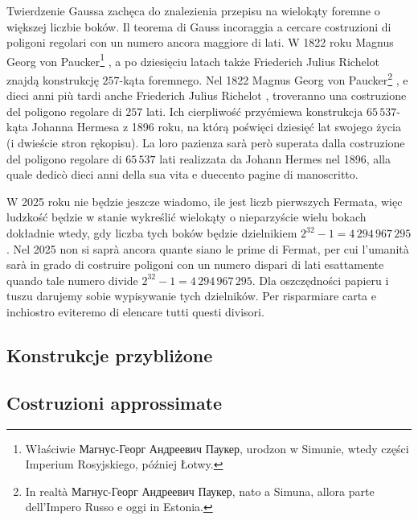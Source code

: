 Twierdzenie Gaussa zachęca do znalezienia przepisu na wielokąty foremne o większej liczbie boków. %
Il teorema di Gauss incoraggia a cercare costruzioni di poligoni regolari con un numero ancora maggiore di lati. %
W 1822 roku Magnus Georg von Paucker\footnote{Właściwie Магнус-Георг Андреевич Паукер, urodzon w Simunie, wtedy części Imperium Rosyjskiego, później Łotwy.} \cite{paucker_1822}, a po dziesięciu latach także Friederich Julius Richelot \cite{richelot_1832} znajdą konstrukcję $257$-kąta foremnego. %
Nel 1822 Magnus Georg von Paucker\footnote{In realtà Магнус-Георг Андреевич Паукер, nato a Simuna, allora parte dell'Impero Russo e oggi in Estonia.} \cite{paucker_1822}, e dieci anni più tardi anche Friederich Julius Richelot \cite{richelot_1832}, troveranno una costruzione del poligono regolare di $257$ lati. %
%
%
%
Ich cierpliwość przyćmiewa konstrukcja $65\,537$-kąta Johanna Hermesa z 1896 roku, na którą poświęci dziesięć lat swojego życia (i dwieście stron rękopisu). %
La loro pazienza sarà però superata dalla costruzione del poligono regolare di $65\,537$ lati realizzata da Johann Hermes nel 1896, alla quale dedicò dieci anni della sua vita e duecento pagine di manoscritto. %

W 2025 roku nie będzie jeszcze wiadomo, ile jest liczb pierwszych Fermata, więc ludzkość będzie w stanie wykreślić wielokąty o nieparzyście wielu bokach dokładnie wtedy, gdy liczba tych boków będzie dzielnikiem $2^{32} - 1 = 4\,294\,967\,295$. %
Nel 2025 non si saprà ancora quante siano le prime di Fermat, per cui l'umanità sarà in grado di costruire poligoni con un numero dispari di lati esattamente quando tale numero divide $2^{32}-1=4\,294\,967\,295$. %
Dla oszczędności papieru i tuszu darujemy sobie wypisywanie tych dzielników. %
Per risparmiare carta e inchiostro eviteremo di elencare tutti questi divisori. %


\subsection{Konstrukcje przybliżone} %
\subsection{Costruzioni approssimate} %

